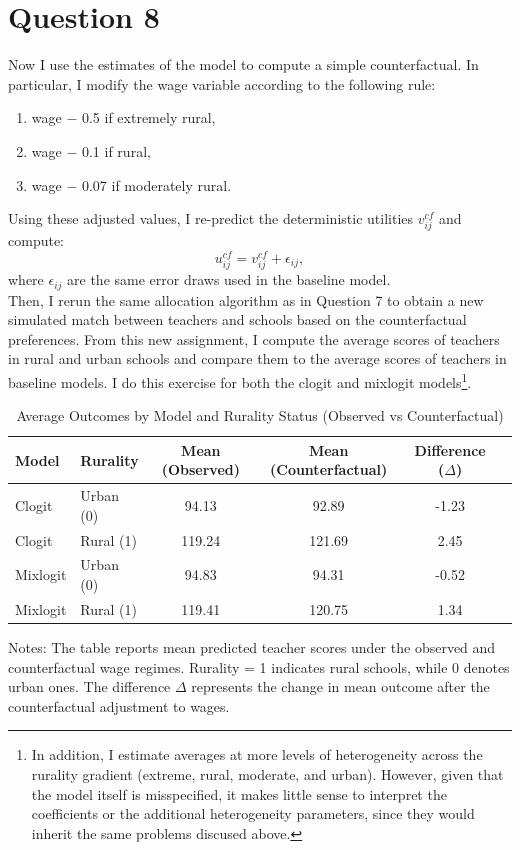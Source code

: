 \documentclass{article}
\begin{document}
\section*{Question 8}

Now I use the estimates of the model to compute a simple counterfactual. In particular, I modify the wage variable according to the following rule:

\begin{enumerate}
    \item wage $-$ 0.5 if extremely rural,
    \item wage $-$ 0.1 if rural,
    \item wage $-$ 0.07 if moderately rural.
\end{enumerate}

Using these adjusted values, I re-predict the deterministic utilities $v_{ij}^{cf}$ and compute:
\[
u_{ij}^{cf} = v_{ij}^{cf} + \epsilon_{ij},
\]
where $\epsilon_{ij}$ are the same error draws used in the baseline model. \\

Then, I rerun the same allocation algorithm as in Question 7 to obtain a new simulated match between teachers and schools based on the counterfactual preferences. From this new assignment, I compute the average scores of teachers in rural and urban schools and compare them to the average scores of teachers in baseline models. I do this exercise for both the clogit and mixlogit models\footnote{In addition, I estimate averages at more levels of heterogeneity across the rurality gradient (extreme, rural, moderate, and urban). However, given that the model itself is misspecified, it makes little sense to interpret the coefficients or the additional heterogeneity parameters, since they would inherit the same problems discused above.}.


\begin{table}[H]
\centering
\caption{Average Outcomes by Model and Rurality Status (Observed vs Counterfactual)}
\label{tab:avg_outcomes_cf}
\begin{threeparttable}
\begin{tabular}{llcccc}
\toprule
Model & Rurality & Mean (Observed) & Mean (Counterfactual) & Difference ($\Delta$) \\
\midrule
Clogit    & Urban (0) & 94.13 & 92.89 & -1.23 \\
Clogit    & Rural (1) & 119.24 & 121.69 &  2.45 \\
Mixlogit  & Urban (0) & 94.83 & 94.31 & -0.52 \\
Mixlogit  & Rural (1) & 119.41 & 120.75 &  1.34 \\
\bottomrule
\end{tabular}
\begin{tablenotes}
\footnotesize
\item Notes: The table reports mean predicted teacher scores under the observed and counterfactual wage regimes.
Rurality = 1 indicates rural schools, while 0 denotes urban ones. 
The difference $\Delta$ represents the change in mean outcome after the counterfactual adjustment to wages.
\end{tablenotes}
\end{threeparttable}
\end{table}
\end{document}
